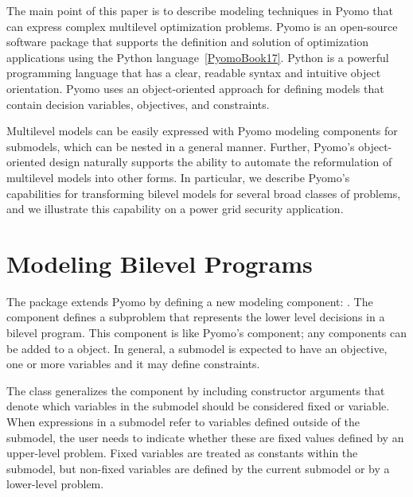 \documentclass[a4paper,11pt]{article}
\begin{document}
The main point of this paper is to describe modeling techniques in
Pyomo that can express complex multilevel optimization problems.
Pyomo is an open-source software package that supports the definition
and solution of optimization applications using the Python
language~\ref{PyomoBook17}.  Python is a powerful programming
language that has a clear, readable syntax and intuitive object
orientation.  Pyomo uses an object-oriented approach for defining
models that contain decision variables, objectives, and constraints.

Multilevel models can be easily expressed with Pyomo modeling
components for submodels, which can be nested in a general manner.
Further, Pyomo's object-oriented design naturally supports the
ability to automate the reformulation of multilevel models into
other forms.  In particular, we describe Pyomo's capabilities for
transforming bilevel models for several broad classes of problems,
and we illustrate this capability on a power grid security application.

\section{Modeling Bilevel Programs}

The  package extends Pyomo by defining a new
modeling component: .  The  component
defines a subproblem that represents the lower level decisions in
a bilevel program.  This component is like Pyomo's  component;
any components can be added to a  object.  In general,
a submodel is expected to have an objective, one or more variables
and it may define constraints.

The  class generalizes the  component
by including constructor arguments that denote which variables in
the submodel should be considered fixed or variable.  When expressions
in a submodel refer to variables defined outside of the submodel,
the user needs to indicate whether these are fixed values defined
by an upper-level problem.  Fixed variables are treated as constants
within the submodel, but non-fixed variables are defined by the
current submodel or by a lower-level problem.
\end{document}

